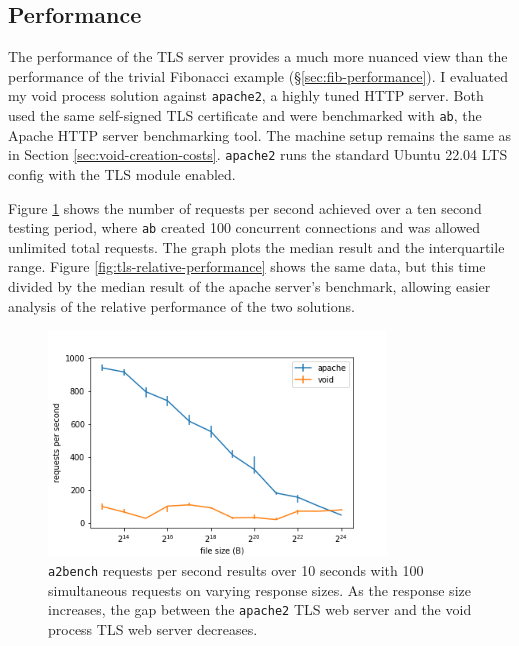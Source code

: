 \documentclass[12pt,a4paper,twoside]{report}
\begin{document}
\subsection{Performance}
\label{sec:tls-performance}

The performance of the TLS server provides a much more nuanced view than the performance of the trivial Fibonacci example (§\ref{sec:fib-performance}). I evaluated my void process solution against \texttt{apache2}, a highly tuned HTTP server. Both used the same self-signed TLS certificate and were benchmarked with \texttt{ab}, the Apache HTTP server benchmarking tool. The machine setup remains the same as in Section \ref{sec:void-creation-costs}. \texttt{apache2} runs the standard Ubuntu 22.04 LTS config with the TLS module enabled.

Figure \ref{fig:tls-performance} shows the number of requests per second achieved over a ten second testing period, where \texttt{ab} created 100 concurrent connections and was allowed unlimited total requests. The graph plots the median result and the interquartile range. Figure \ref{fig:tls-relative-performance} shows the same data, but this time divided by the median result of the apache server's benchmark, allowing easier analysis of the relative performance of the two solutions.

\begin{figure}
    \centering
    \includegraphics[width=0.8\textwidth]{graphs/tls_performance.png}

    \caption{\texttt{a2bench} requests per second results over 10 seconds with 100 simultaneous requests on varying response sizes. As the response size increases, the gap between the \texttt{apache2} TLS web server and the void process TLS web server decreases.}
    \label{fig:tls-performance}
\end{figure}
\end{document}
